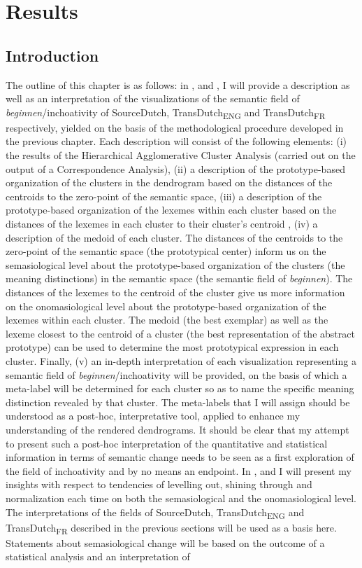\chapter{Results}
\label{sec:4}
\section{Introduction}
\label{sec:4.1}  
The outline of this chapter is as follows: in ,  and , I will provide a description as well as an interpretation of the visualizations of the semantic field of \textit{beginnen}/inchoativity of SourceDutch, TransDutch\textsubscript{ENG} and TransDutch\textsubscript{FR} respectively, yielded on the basis of the methodological procedure developed in the previous chapter. Each description will consist of the following elements: (i) the results of the Hierarchical Agglomerative Cluster Analysis (carried out on the output of a Correspondence Analysis), (ii) a description of the prototype-based organization of the clusters in the dendrogram based on the distances of the centroids to the zero-point of the semantic space, (iii) a description of the prototype-based organization of the lexemes within each cluster based on the distances of the lexemes in each cluster to their cluster’s centroid , (iv) a description of the medoid of each cluster. The distances of the centroids to the zero-point of the semantic space (the prototypical center) inform us on the semasiological level about the prototype-based organization of the clusters (the meaning distinctions) in the semantic space (the semantic field of \textit{beginnen}). The distances of the lexemes to the centroid of the cluster give us more information on the onomasiological level about the prototype-based organization of the lexemes within each cluster. The medoid (the best exemplar) as well as the lexeme closest to the centroid of a cluster (the best representation of the abstract prototype) can be used to determine the most prototypical expression in each cluster. Finally, (v) an in-depth interpretation of each visualization representing a semantic field of \textit{beginnen}/inchoativity will be provided, on the basis of which a meta-label will be determined for each cluster so as to name the specific meaning distinction revealed by that cluster. The meta-labels that I will assign should be understood as a post-hoc, interpretative tool, applied to enhance my understanding of the rendered dendrograms. It should be clear that my attempt to present such a post-hoc interpretation of the quantitative and statistical information in terms of semantic change needs to be seen as a first exploration of the field of inchoativity and by no means an endpoint. In ,  and  I will present my insights with respect to tendencies of levelling out, shining through and normalization each time on both the semasiological and the onomasiological level. The interpretations of the fields of SourceDutch, TransDutch\textsubscript{ENG} and TransDutch\textsubscript{FR} described in the previous sections will be used as a basis here. Statements about semasiological change will be based on the outcome of a statistical analysis and an interpretation of 